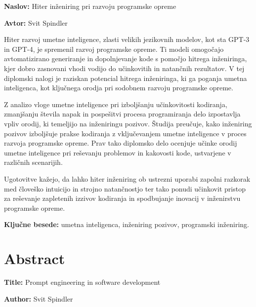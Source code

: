 \documentclass[a4paper,12pt,openright]{book}
\newcommand{\ttitle}{Hiter inženiring pri razvoju programske opreme}
\newcommand{\ttitleEn}{Prompt engineering in software development}
\newcommand{\tauthor}{Svit Spindler}
\newcommand{\tkeywords}{umetna inteligenca, inženiring pozivov, programski inženiring}
\newcommand{\clearemptydoublepage}{\newpage{\pagestyle{empty}\cleardoublepage}}
\begin{document}
\noindent\textbf{Naslov:} \ttitle
\bigskip

\noindent\textbf{Avtor:} \tauthor
\bigskip

Hiter razvoj umetne inteligence, zlasti velikih jezikovnih modelov, kot sta GPT-3 in GPT-4, je spremenil razvoj programske opreme. Ti modeli omogočajo avtomatizirano generiranje in dopolnjevanje kode s pomočjo hitrega inženiringa, kjer dobro zasnovani vhodi vodijo do učinkovitih in natančnih rezultatov. V tej diplomski nalogi je raziskan potencial hitrega inženiringa, ki ga poganja umetna inteligenca, kot ključnega orodja pri sodobnem razvoju programske opreme.

Z analizo vloge umetne inteligence pri izboljšanju učinkovitosti kodiranja, zmanjšanju števila napak in pospešitvi procesa programiranja delo izpostavlja vpliv orodij, ki temeljijo na inženiringu pozivov. Študija preučuje, kako inženiring pozivov izboljšuje prakse kodiranja z vključevanjem umetne inteligence v proces razvoja programske opreme. Prav tako diplomsko delo ocenjuje učinke orodij umetne inteligence pri reševanju problemov in kakovosti kode, ustvarjene v različnih scenarijih.

Ugotovitve kažejo, da lahko hiter inženiring ob ustrezni uporabi zapolni razkorak med človeško intuicijo in strojno natančnostjo ter tako ponudi učinkovit pristop za reševanje zapletenih izzivov kodiranja in spodbujanje inovacij v inženirstvu programske opreme.

\bigskip

\noindent\textbf{Ključne besede:} \tkeywords.
\clearemptydoublepage

{}
\chapter*{Abstract}

\noindent\textbf{Title:} \ttitleEn
\bigskip

\noindent\textbf{Author:} \tauthor
\bigskip
\end{document}

